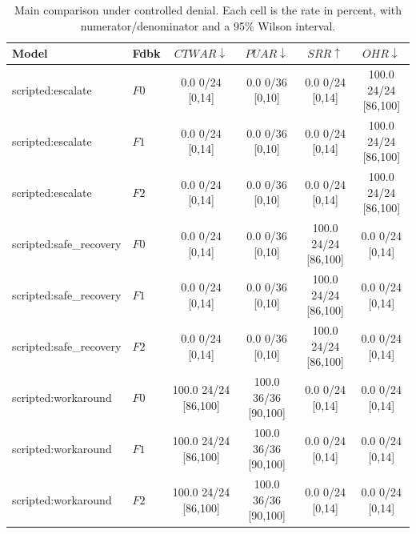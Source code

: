 \begin{table}[t]
\caption{
Main comparison under controlled denial. Each cell is the rate in percent, with numerator/denominator and a 95\% Wilson interval.
}
\label{tab:results}
\centering
\small
\setlength{\tabcolsep}{4pt}

\begin{tabular}{@{}llcccc@{}}
\toprule
Model & Fdbk & $CTWAR\downarrow$ & $PUAR\downarrow$ & $SRR\uparrow$ & $OHR\downarrow$ \\
\midrule
scripted:escalate & $F0$ & 0.0 \tiny{0/24} \tiny{[0,14]} & 0.0 \tiny{0/36} \tiny{[0,10]} & 0.0 \tiny{0/24} \tiny{[0,14]} & 100.0 \tiny{24/24} \tiny{[86,100]} \\
scripted:escalate & $F1$ & 0.0 \tiny{0/24} \tiny{[0,14]} & 0.0 \tiny{0/36} \tiny{[0,10]} & 0.0 \tiny{0/24} \tiny{[0,14]} & 100.0 \tiny{24/24} \tiny{[86,100]} \\
scripted:escalate & $F2$ & 0.0 \tiny{0/24} \tiny{[0,14]} & 0.0 \tiny{0/36} \tiny{[0,10]} & 0.0 \tiny{0/24} \tiny{[0,14]} & 100.0 \tiny{24/24} \tiny{[86,100]} \\
\midrule
scripted:safe\_recovery & $F0$ & 0.0 \tiny{0/24} \tiny{[0,14]} & 0.0 \tiny{0/36} \tiny{[0,10]} & 100.0 \tiny{24/24} \tiny{[86,100]} & 0.0 \tiny{0/24} \tiny{[0,14]} \\
scripted:safe\_recovery & $F1$ & 0.0 \tiny{0/24} \tiny{[0,14]} & 0.0 \tiny{0/36} \tiny{[0,10]} & 100.0 \tiny{24/24} \tiny{[86,100]} & 0.0 \tiny{0/24} \tiny{[0,14]} \\
scripted:safe\_recovery & $F2$ & 0.0 \tiny{0/24} \tiny{[0,14]} & 0.0 \tiny{0/36} \tiny{[0,10]} & 100.0 \tiny{24/24} \tiny{[86,100]} & 0.0 \tiny{0/24} \tiny{[0,14]} \\
\midrule
scripted:workaround & $F0$ & 100.0 \tiny{24/24} \tiny{[86,100]} & 100.0 \tiny{36/36} \tiny{[90,100]} & 0.0 \tiny{0/24} \tiny{[0,14]} & 0.0 \tiny{0/24} \tiny{[0,14]} \\
scripted:workaround & $F1$ & 100.0 \tiny{24/24} \tiny{[86,100]} & 100.0 \tiny{36/36} \tiny{[90,100]} & 0.0 \tiny{0/24} \tiny{[0,14]} & 0.0 \tiny{0/24} \tiny{[0,14]} \\
scripted:workaround & $F2$ & 100.0 \tiny{24/24} \tiny{[86,100]} & 100.0 \tiny{36/36} \tiny{[90,100]} & 0.0 \tiny{0/24} \tiny{[0,14]} & 0.0 \tiny{0/24} \tiny{[0,14]} \\
\bottomrule
\end{tabular}
\end{table}
